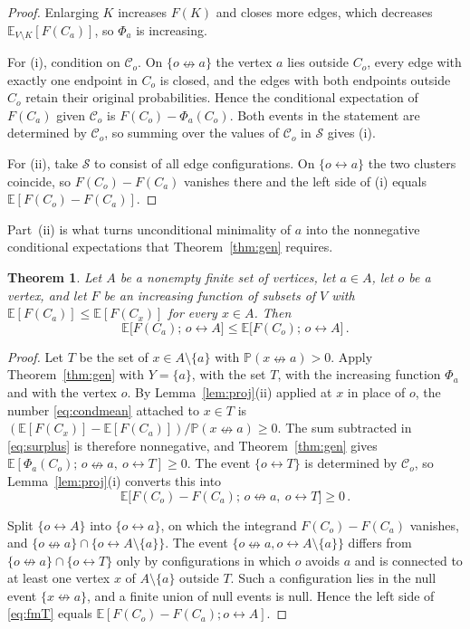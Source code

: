\documentclass[11pt]{article}
\newtheorem{theorem}{Theorem}[section]
\theoremstyle{definition}
\theoremstyle{remark}
\newcommand{\PP}{\mathbb P}
\newcommand{\EE}{\mathbb E}
\newcommand{\con}{\leftrightarrow}
\newcommand{\ncon}{\nleftrightarrow}
\newcommand{\eC}{\mathcal C}
\begin{document}
\begin{proof}
Enlarging $K$ increases $F(K)$ and closes more edges, which decreases
$\EE_{V\setminus K}[F(C_a)]$, so $\Phi_a$ is increasing.

For (i), condition on $\eC_o$. On $\{o\ncon a\}$ the vertex $a$ lies outside $C_o$, every
edge with exactly one endpoint in $C_o$ is closed, and the edges with both endpoints
outside $C_o$ retain their original probabilities. Hence the conditional expectation of $F(C_a)$ given
$\eC_o$ is $F(C_o)-\Phi_a(C_o)$. Both events in the statement are determined by $\eC_o$, so
summing over the values of $\eC_o$ in $\mathcal S$ gives (i).

For (ii), take $\mathcal S$ to consist of all edge configurations. On $\{o\con a\}$ the two
clusters coincide, so $F(C_o)-F(C_a)$ vanishes there and the left side of (i) equals
$\EE[F(C_o)-F(C_a)]$.
\end{proof}

Part~(ii) is what turns unconditional minimality of $a$ into the nonnegative conditional
expectations that Theorem~\ref{thm:gen} requires.

\begin{theorem}\label{thm:fixedmin}
Let $A$ be a nonempty finite set of vertices, let $a\in A$, let $o$ be a vertex, and let
$F$ be an increasing function of subsets of $V$ with $\EE[F(C_a)]\leq\EE[F(C_x)]$ for every
$x\in A$. Then
\[
 \EE\bigl[F(C_a);\,o\con A\bigr]\leq \EE\bigl[F(C_o);\,o\con A\bigr]\,.
\]
\end{theorem}

\begin{proof}
Let $T$ be the set of $x\in A\setminus\{a\}$ with $\PP(x\ncon a)>0$. Apply
Theorem~\ref{thm:gen} with $Y=\{a\}$, with the set $T$, with the increasing function
$\Phi_a$ and with the vertex $o$. By Lemma~\ref{lem:proj}(ii) applied at $x$ in place of
$o$, the number \eqref{eq:condmean} attached to $x\in T$ is
$(\EE[F(C_x)]-\EE[F(C_a)])/\PP(x\ncon a)\geq0$. The sum subtracted in \eqref{eq:surplus} is
therefore nonnegative, and Theorem~\ref{thm:gen} gives
$\EE[\Phi_a(C_o);\,o\ncon a,\ o\con T]\geq0$. The event $\{o\con T\}$ is determined by
$\eC_o$, so Lemma~\ref{lem:proj}(i) converts this into
\begin{equation}\label{eq:fmT}
 \EE\bigl[F(C_o)-F(C_a);\,o\ncon a,\ o\con T\bigr]\geq 0\,.
\end{equation}

Split $\{o\con A\}$ into $\{o\con a\}$, on which the integrand $F(C_o)-F(C_a)$ vanishes,
and $\{o\ncon a\}\cap\{o\con A\setminus\{a\}\}$. The event
$\{o\ncon a,o\con A\setminus\{a\}\}$ differs from $\{o\ncon
a\}\cap\{o\con T\}$ only by configurations in which $o$ avoids $a$ and is connected to at
least one vertex $x$ of $A\setminus\{a\}$ outside $T$. Such a configuration lies in the null event
$\{x\ncon a\}$, and a finite union of null events is null. Hence the left side of
\eqref{eq:fmT} equals $\EE[F(C_o)-F(C_a);o\con A]$.
\end{proof}
\end{document}
